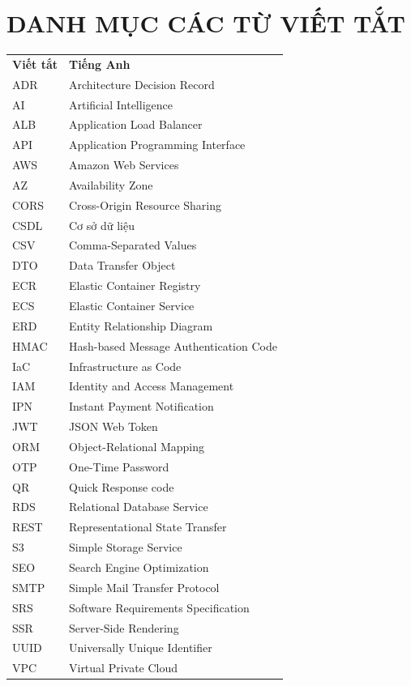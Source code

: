 \newpage
\section*{DANH MỤC CÁC TỪ VIẾT TẮT}

{
\renewcommand{\arraystretch}{1.3}
\begin{longtable}{ >{\centering\arraybackslash}p{3cm} p{9cm} }
    \textbf{Viết tắt} & \textbf{Tiếng Anh} \\

    ADR & Architecture Decision Record \\
    AI & Artificial Intelligence \\
    ALB & Application Load Balancer \\
    API & Application Programming Interface \\
    AWS & Amazon Web Services \\
    AZ & Availability Zone \\
    CORS & Cross-Origin Resource Sharing \\
    CSDL & Cơ sở dữ liệu \\
    CSV & Comma-Separated Values \\
    DTO & Data Transfer Object \\
    ECR & Elastic Container Registry \\
    ECS & Elastic Container Service \\
    ERD & Entity Relationship Diagram \\
    HMAC & Hash-based Message Authentication Code \\
    IaC & Infrastructure as Code \\
    IAM & Identity and Access Management \\
    IPN & Instant Payment Notification \\
    JWT & JSON Web Token \\
    ORM & Object-Relational Mapping \\
    OTP & One-Time Password \\
    QR & Quick Response code \\
    RDS & Relational Database Service \\
    REST & Representational State Transfer \\
    S3 & Simple Storage Service \\
    SEO & Search Engine Optimization \\
    SMTP & Simple Mail Transfer Protocol \\
    SRS & Software Requirements Specification \\
    SSR & Server-Side Rendering \\
    UUID & Universally Unique Identifier \\
    VPC & Virtual Private Cloud \\
\end{longtable}
}
